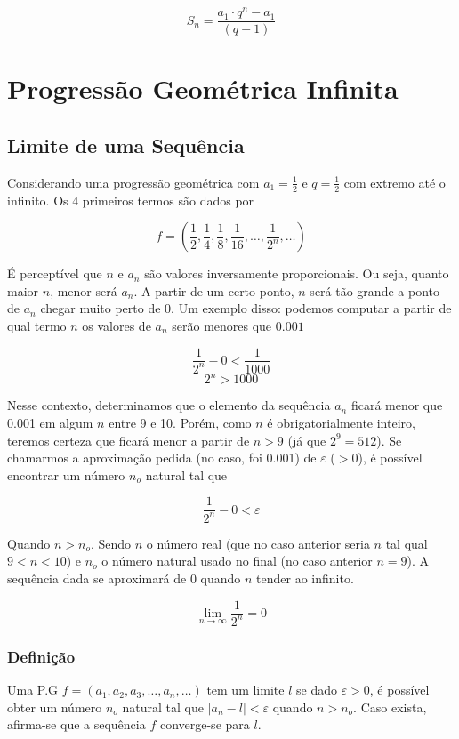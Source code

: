 \documentclass[11pt]{article}
\begin{document}
\[S_{n} = \frac{a_{1} \cdot q^{n} - a_{1}}{(q - 1)}\]

\section{Progressão Geométrica Infinita}

\subsection{Limite de uma Sequência}

Considerando uma progressão geométrica com $a_{1} = \frac{1}{2}$ e $q = \frac{1}{2}$ com extremo até o infinito. Os 4 primeiros termos são dados por

\begin{tcolorbox}[colback=LightYellow]
\[f = \left(\frac{1}{2}, \frac{1}{4}, \frac{1}{8}, \frac{1}{16}, \dots, \frac{1}{2^{n}}, \dots \right)\]
\end{tcolorbox}

É perceptível que $n$ e $a_{n}$ são valores inversamente proporcionais. Ou seja, quanto maior $n$, menor será $a_{n}$. A partir de um certo ponto, $n$ será tão grande a ponto de $a_{n}$ chegar muito perto de 0. Um exemplo disso: podemos computar a partir de qual termo $n$ os valores de $a_{n}$ serão menores que $0.001$

\[\frac{1}{2^{n}} - 0 < \frac{1}{1000}\]
\[2^{n} > 1000\]

Nesse contexto, determinamos que o elemento da sequência $a_{n}$ ficará menor que 0.001 em algum $n$ entre 9 e 10. Porém, como $n$ é obrigatorialmente inteiro, teremos certeza que ficará menor a partir de $n > 9$ (já que $2^{9} = 512$). Se chamarmos a aproximação pedida (no caso, foi 0.001) de $\varepsilon$ ($> 0$), é possível encontrar um número $n_{o}$ natural tal que

\[\frac{1}{2^{n}} - 0 < \varepsilon\]

Quando $n > n_{o}$. Sendo $n$ o número real (que no caso anterior seria $n$ tal qual $9 < n < 10$) e $n_{o}$ o número natural usado no final (no caso anterior $n = 9$). A sequência dada se aproximará de 0 quando $n$ tender ao infinito.

\[\lim_{n\to \infty} \frac{1}{2^{n}} = 0\]

\subsubsection{Definição}

Uma P.G $f = (a_{1}, a_{2}, a_{3}, \dots, a_{n}, \dots)$ tem um limite $l$ se dado $\varepsilon > 0$, é possível obter um número $n_{o}$ natural tal que $|a_{n} - l| < \varepsilon$ quando $n > n_{o}$. Caso exista, afirma-se que a sequência $f$ converge-se para $l$.
\end{document}
